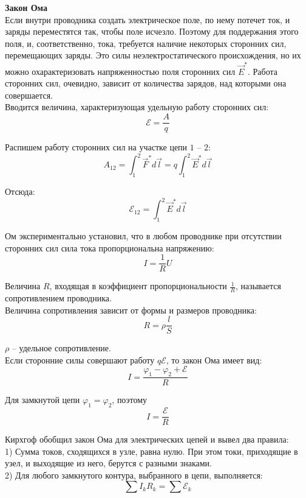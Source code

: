 \documentclass{article}
\begin{document}
	
	\textbf{Закон Ома}\\

	Если внутри проводника создать электрическое поле, по нему потечет ток, и заряды переместятся так, чтобы поле исчезло. Поэтому для поддержания этого поля, и, соответственно, тока, требуется наличие некоторых сторонних сил, перемещающих заряды. Это силы неэлектростатического происхождения, но их можно охарактеризовать напряженностью поля сторонних сил $\vec E^*$. Работа сторонних сил, очевидно, зависит от количества зарядов, над которыми она совершается.\\

	Вводится величина, характеризующая удельную работу сторонних сил:
	\begin{equation}
		\mathcal{E} = \frac{A}{q}
	\end{equation}

	Распишем работу сторонних сил на участке цепи $1$ -- $2$:
	\begin{equation}
		A_{12} = \int_1^2\vec F^* d\vec l = q\int_1^2 \vec E^* d\vec l
	\end{equation}

	Отсюда:
	\begin{equation}
		\mathcal{E}_{12} = \int_1^2 \vec E^* d\vec l
	\end{equation}

	Ом экспериментально установил, что в любом проводнике при отсутствии сторонних сил сила тока пропорциональна напряжению:
	\begin{equation}
		I = \frac{1}{R} U
	\end{equation}

	Величина $R$, входящая в коэффициент пропорциональности $\frac{1}{R}$, называется сопротивлением проводника.\\

	Величина сопротивления зависит от формы и размеров проводника:
	\begin{equation}
		R = \rho\frac{l}{S}
	\end{equation}

	$\rho$ -- удельное сопротивление. \\

	Если сторонние силы совершают работу $q\mathcal{E}$, то закон Ома имеет вид:
	\begin{equation}
		I = \frac{\varphi_1-\varphi_2 + \mathcal{E}}{R}
	\end{equation}

	Для замкнутой цепи $\varphi_1 = \varphi_2$, поэтому
	\begin{equation}
		I = \frac{\mathcal{E}}{R}
	\end{equation}

	Кирхгоф обобщил закон Ома для электрических цепей и вывел два правила:\\
	1) Сумма токов, сходящихся в узле, равна нулю. При этом токи, приходящие в узел, и выходящие из него, берутся с разными знаками.\\
	2) Для любого замкнутого контура, выбранного в цепи, выполняется:
	\begin{equation}
		\sum I_kR_k = \sum \mathcal{E}_k
	\end{equation}
\end{document}
